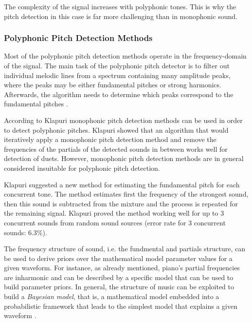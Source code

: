 \documentclass[11pt]{article} %
\begin{document}
The complexity of the signal increases with polyphonic tones. This is why the pitch detection in this case is far more challenging than in monophonic sound. 

\subsubsection{Polyphonic Pitch Detection Methods}
Most of the polyphonic pitch detection methods operate in the frequency-domain of the signal. The main task of the polyphonic pitch detector is to filter out individual melodic lines from a spectrum containing many amplitude peaks, where the peaks may be either fundamental pitches or strong harmonics. Afterwards, the algorithm needs to determine which peaks correspond to the fundamental pitches \citep*{Roads1996}. 


According to Klapuri \citeyearpar{Klapuri1999} monophonic pitch detection methods can be used in order to detect polyphonic pitches. Klapuri showed that an algorithm that would iteratively apply a monophonic pitch detection method and remove the frequencies of the partials of the detected sounds in between works well for detection of duets. However, monophonic pitch detection methods are in general considered insuitable for polyphonic pitch detection. 

Klapuri \citeyearpar{Klapuri2003} suggested a new method for estimating the fundamental pitch for each concurrent tone. The method estimates first the frequency of the strongest sound, then this sound is subtracted from the mixture and the process is repeated for the remaining signal. Klapuri proved the method working well for up to 3 concurrent sounds from random sound sources (error rate for 3 concurrent sounds: 6.3\%).

The frequency structure of sound, i.e. the fundmental and partials structure, can be used to derive priors over the mathematical model parameter values for a given waveform. For instance, as already mentioned, piano's partial frequencies are inharmonic and can be described by a specific model that can be used to build parameter priors. In general, the structure of music can be exploited to build a \textit{Bayesian model}, that is, a mathematical model embedded into a probabilistic framework that leads to the simplest model that explains a given waveform \citep*{Davy2006}.
\end{document}
